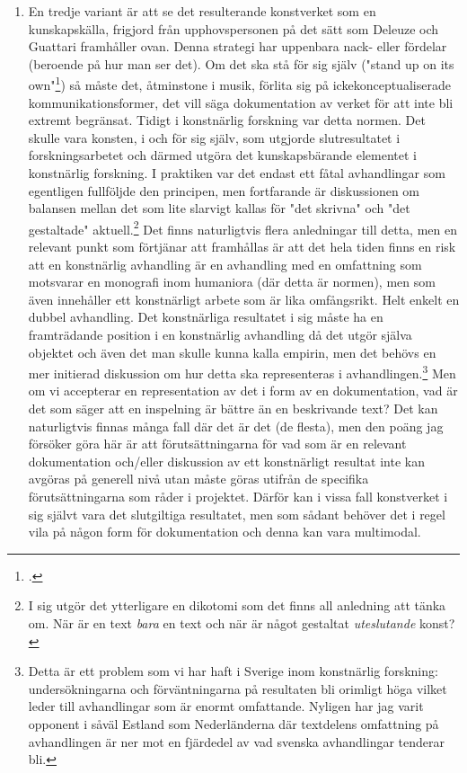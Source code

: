 \documentclass[11pt]{article}
\begin{document}
\begin{enumerate}
  \item En tredje variant är att se det resulterande konstverket som
    en kunskapskälla, frigjord från upphovspersonen på det sätt som
    Deleuze och Guattari framhåller ovan. Denna strategi har uppenbara
    nack- eller fördelar (beroende på hur man ser det). Om det ska stå
    för sig själv ("stand up on its own"\footcite{deleuze1994}) så
    måste det, åtminstone i musik, förlita sig på
    ickekonceptualiserade kommunikationsformer, det vill säga
    dokumentation av verket för att inte bli extremt begränsat. Tidigt
    i konstnärlig forskning var detta normen. Det skulle vara konsten,
    i och för sig själv, som utgjorde slutresultatet i
    forskningsarbetet och därmed utgöra det kunskapsbärande elementet
    i konstnärlig forskning. I praktiken var det endast ett fåtal
    avhandlingar som egentligen fullföljde den principen, men
    fortfarande är diskussionen om balansen mellan det som lite
    slarvigt kallas för "det skrivna" och "det gestaltade"
    aktuell.\footnote{I sig utgör det ytterligare en dikotomi som det
        finns all anledning att tänka om. När är en text \emph{bara}
        en text och när är något gestaltat \emph{uteslutande} konst?}
    Det finns naturligtvis flera anledningar till detta, men en
    relevant punkt som förtjänar att framhållas är att det hela tiden
    finns en risk att en konstnärlig avhandling är en avhandling med
    en omfattning som motsvarar en monografi inom humaniora (där detta
    är normen), men som även innehåller ett konstnärligt arbete som är
    lika omfångsrikt. Helt enkelt en dubbel avhandling. Det
    konstnärliga resultatet i sig måste ha en framträdande position i
    en konstnärlig avhandling då det utgör själva objektet och även
    det man skulle kunna kalla empirin, men det behövs en mer
    initierad diskussion om hur detta ska representeras i
    avhandlingen.\footnote{Detta är ett problem som vi har haft i
        Sverige inom konstnärlig forskning: undersökningarna och
        förväntningarna på resultaten bli orimligt höga vilket leder
        till avhandlingar som är enormt omfattande. Nyligen har jag
        varit opponent i såväl Estland som Nederländerna där
        textdelens omfattning på avhandlingen är ner mot en fjärdedel
        av vad svenska avhandlingar tenderar bli.} Men om vi
    accepterar en representation av det i form av en dokumentation,
    vad är det som säger att en inspelning är bättre än en beskrivande
    text? Det kan naturligtvis finnas många fall där det är det (de
    flesta), men den poäng jag försöker göra här är att
    förutsättningarna för vad som är en relevant dokumentation
    och/eller diskussion av ett konstnärligt resultat inte kan avgöras
    på generell nivå utan måste göras utifrån de specifika
    förutsättningarna som råder i projektet. Därför kan i vissa fall
    konstverket i sig självt vara det slutgiltiga resultatet, men som
    sådant behöver det i regel vila på någon form för dokumentation
    och denna kan vara multimodal.
\end{enumerate}
\end{document}
